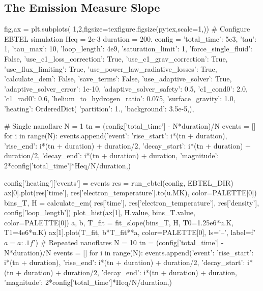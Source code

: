 \subsection{The Emission Measure Slope}


\begin{pycode}
fig,ax = plt.subplots(
    1,2,figsize=texfigure.figsize(pytex,scale=1,))
# Configure EBTEL simulation
Heq = 2e-3
duration = 200.
config = {
    'total_time': 5e3,
    'tau': 1,
    'tau_max': 10,
    'loop_length': 4e9,
    'saturation_limit': 1,
    'force_single_fluid': False,
    'use_c1_loss_correction': True,
    'use_c1_grav_correction': True,
    'use_flux_limiting': True,
    'use_power_law_radiative_losses': True,
    'calculate_dem': False,
    'save_terms': False,
    'use_adaptive_solver': True,
    'adaptive_solver_error': 1e-10,
    'adaptive_solver_safety': 0.5,
    'c1_cond0': 2.0,
    'c1_rad0': 0.6,
    'helium_to_hydrogen_ratio': 0.075,
    'surface_gravity': 1.0,
    'heating': OrderedDict({
        'partition': 1.,
        'background': 3.5e-5,}),
}

# Single nanoflare
N = 1
tn = (config['total_time'] - N*duration)/N
events = []
for i in range(N):
    events.append({'event':{
        'rise_start': i*(tn + duration),
        'rise_end': i*(tn + duration) + duration/2,
        'decay_start': i*(tn + duration) + duration/2,
        'decay_end': i*(tn + duration) + duration,
        'magnitude': 2*config['total_time']*Heq/N/duration,}})

config['heating']['events'] = events
res = run_ebtel(config, EBTEL_DIR)
ax[0].plot(res['time'], res['electron_temperature'].to(u.MK), color=PALETTE[0])
bins_T, H = calculate_em(
    res['time'], res['electron_temperature'], res['density'], config['loop_length'])
plot_hist(ax[1], H.value, bins_T.value, color=PALETTE[0])
a, b, T_fit = fit_slope(bins_T, H, T0=1.25e6*u.K, T1=4e6*u.K)
ax[1].plot(T_fit, b*T_fit**a, color=PALETTE[0], ls='--', label=f'$a={a:.1f}$')
# Repeated nanoflares
N = 10
tn = (config['total_time'] - N*duration)/N
events = []
for i in range(N):
    events.append({'event':{
        'rise_start': i*(tn + duration),
        'rise_end': i*(tn + duration) + duration/2,
        'decay_start': i*(tn + duration) + duration/2,
        'decay_end': i*(tn + duration) + duration,
        'magnitude': 2*config['total_time']*Heq/N/duration,}})


\end{pycode}
